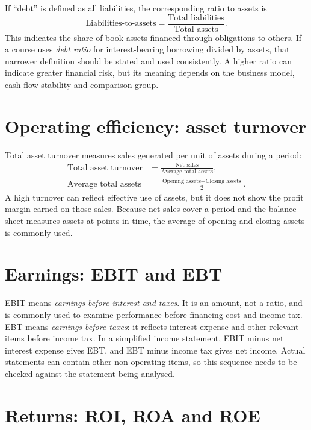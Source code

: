 \documentclass[12pt,a4paper]{report}
\begin{document}
If ``debt'' is defined as all liabilities, the corresponding ratio to assets is
\begin{equation*}
\text{Liabilities-to-assets}=\frac{\text{Total liabilities}}{\text{Total assets}}.
\end{equation*}
This indicates the share of book assets financed through obligations to others. If a course uses \emph{debt ratio} for interest-bearing borrowing divided by assets, that narrower definition should be stated and used consistently. A higher ratio can indicate greater financial risk, but its meaning depends on the business model, cash-flow stability and comparison group.

\section{Operating efficiency: asset turnover}

Total asset turnover measures sales generated per unit of assets during a period:
\begin{align*}
\text{Total asset turnover}&=\frac{\text{Net sales}}{\text{Average total assets}},\\
\text{Average total assets}&=\frac{\text{Opening assets}+\text{Closing assets}}{2}.
\end{align*}
A high turnover can reflect effective use of assets, but it does not show the profit margin earned on those sales. Because net sales cover a period and the balance sheet measures assets at points in time, the average of opening and closing assets is commonly used.

\section{Earnings: EBIT and EBT}

EBIT means \emph{earnings before interest and taxes}. It is an amount, not a ratio, and is commonly used to examine performance before financing cost and income tax. EBT means \emph{earnings before taxes}: it reflects interest expense and other relevant items before income tax. In a simplified income statement, EBIT minus net interest expense gives EBT, and EBT minus income tax gives net income. Actual statements can contain other non-operating items, so this sequence needs to be checked against the statement being analysed.

\section{Returns: ROI, ROA and ROE}
\end{document}
